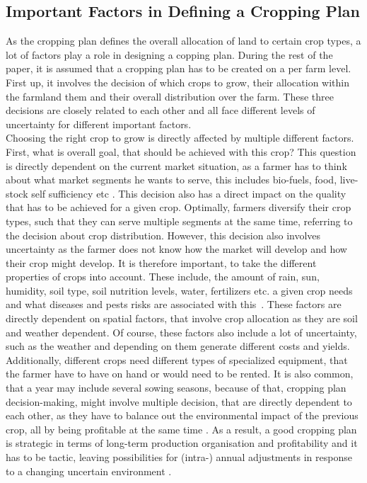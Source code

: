 \documentclass{Academic}
\begin{document}
    \subsection{Important Factors in Defining a Cropping Plan}
    As the cropping plan defines the overall allocation of land to certain crop types, a lot of factors play a role in designing a copping plan. During the rest of the paper, it is assumed that a cropping plan has to be created on a per farm level. First up, it involves the decision of which crops to grow, their allocation within the farmland them and their overall distribution over the farm. These three decisions are closely related to each other and all face different levels of uncertainty for different important factors.\\
    Choosing the right crop to grow is directly affected by multiple different factors. First, what is overall goal, that should be achieved with this crop? This question is directly dependent on the current market situation, as a farmer has to think about what market segments he wants to serve, this includes bio-fuels, food, live-stock self sufficiency etc \cite{noauthor_oecd-fao_2021}. This decision also has a direct impact on the quality that has to be achieved for a given crop. Optimally, farmers diversify their crop types, such that they can serve multiple segments at the same time, referring to the decision about crop distribution. However, this decision also involves uncertainty as the farmer does not know how the market will develop and how their crop might develop. It is therefore important, to take the different properties of crops into account. These include, the amount of rain, sun, humidity, soil type, soil nutrition levels, water, fertilizers etc. a given crop needs and what diseases and pests risks are associated with this~\cite{curl_control_1963, noauthor_crop_2023}. These factors are directly dependent on spatial factors, that involve crop allocation as they are soil and weather dependent. Of course, these factors also include a lot of uncertainty, such as the weather and depending on them generate different costs and yields. Additionally, different crops need different types of specialized equipment, that the farmer have to have on hand or would need to be rented. It is also common, that a year may include several sowing seasons, because of that, cropping plan decision-making, might involve multiple decision, that are directly dependent to each other, as they have to balance out the environmental impact of the previous crop, all by being profitable at the same time \cite{dury_models_2012}. As a result, a good cropping plan is strategic in terms of long-term production organisation and profitability and it has to be tactic, leaving possibilities for (intra-) annual adjustments in response to a changing uncertain environment \cite{dury_models_2012}.
\end{document}
